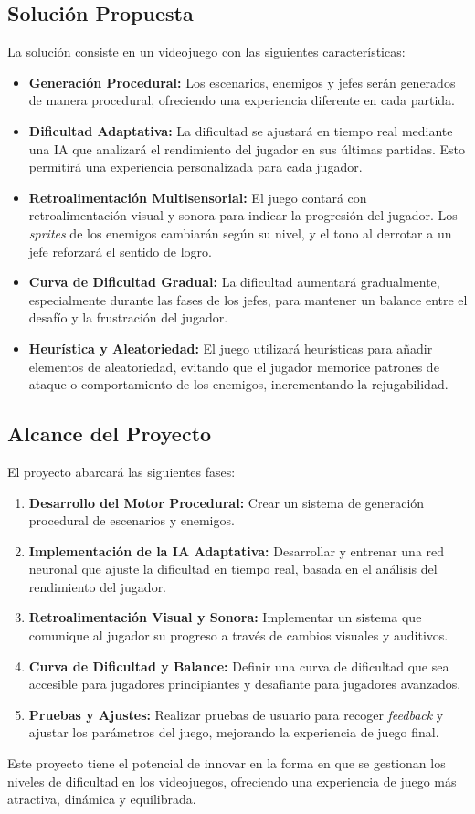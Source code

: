     \subsection{Solución Propuesta}
    
    La solución consiste en un videojuego con las siguientes características:
    \begin{itemize}
        \item \textbf{Generación Procedural:} Los escenarios, enemigos y jefes serán generados de manera procedural, ofreciendo una experiencia diferente en cada partida.
        \item \textbf{Dificultad Adaptativa:} La dificultad se ajustará en tiempo real mediante una IA que analizará el rendimiento del jugador en sus últimas partidas. Esto permitirá una experiencia personalizada para cada jugador.
        \item \textbf{Retroalimentación Multisensorial:} El juego contará con retroalimentación visual y sonora para indicar la progresión del jugador. Los \textit{sprites} de los enemigos cambiarán según su nivel, y el tono al derrotar a un jefe reforzará el sentido de logro.
        \item \textbf{Curva de Dificultad Gradual:} La dificultad aumentará gradualmente, especialmente durante las fases de los jefes, para mantener un balance entre el desafío y la frustración del jugador.
        \item \textbf{Heurística y Aleatoriedad:} El juego utilizará heurísticas para añadir elementos de aleatoriedad, evitando que el jugador memorice patrones de ataque o comportamiento de los enemigos, incrementando la rejugabilidad.
    \end{itemize}
    
    \subsection{Alcance del Proyecto}
    
    El proyecto abarcará las siguientes fases:
    \begin{enumerate}
        \item \textbf{Desarrollo del Motor Procedural:} Crear un sistema de generación procedural de escenarios y enemigos.
        \item \textbf{Implementación de la IA Adaptativa:} Desarrollar y entrenar una red neuronal que ajuste la dificultad en tiempo real, basada en el análisis del rendimiento del jugador.
        \item \textbf{Retroalimentación Visual y Sonora:} Implementar un sistema que comunique al jugador su progreso a través de cambios visuales y auditivos.
        \item \textbf{Curva de Dificultad y Balance:} Definir una curva de dificultad que sea accesible para jugadores principiantes y desafiante para jugadores avanzados.
        \item \textbf{Pruebas y Ajustes:} Realizar pruebas de usuario para recoger \textit{feedback} y ajustar los parámetros del juego, mejorando la experiencia de juego final.
    \end{enumerate}
    
    Este proyecto tiene el potencial de innovar en la forma en que se gestionan los niveles de dificultad en los videojuegos, ofreciendo una experiencia de juego más atractiva, dinámica y equilibrada.
    